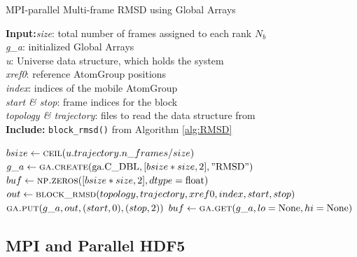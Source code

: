 \begin{algorithm}[ht!]
	\scriptsize
	\caption{MPI-parallel Multi-frame RMSD using Global Arrays}
	\label{alg:GA}
	\hspace*{\algorithmicindent} \textbf{Input:}\emph{size}: total number of frames assigned to each rank $N_{b}$\\
	\hspace*{\algorithmicindent} \emph{g\_a}: initialized Global Arrays \\
        \hspace*{\algorithmicindent} \emph{u}: Universe data structure, which holds the system\\
	\hspace*{\algorithmicindent} \emph{xref0}: reference AtomGroup positions \\
        \hspace*{\algorithmicindent} \emph{index}: indices of the mobile AtomGroup\\
	\hspace*{\algorithmicindent} \emph{start \& stop}: frame indices for the block \\
	\hspace*{\algorithmicindent} \emph{topology \& trajectory}: files to read the data structure from \\
	\hspace*{\algorithmicindent}\textbf{Include:} \texttt{block\_rmsd()} from Algorithm \protect\ref{alg:RMSD}
	\begin{algorithmic}[1]		
		\State $bsize \gets \Call{ceil}{u.trajectory.n\_frames / size}$
		\State $g\_a \gets \Call{ga.create}{\text{ga.C\_DBL}, [bsize*size,2], "\text{RMSD}"}$
		\State $buf \gets \Call{np.zeros}{[bsize*size,2], dtype=\text{float}}$
		\State $out \gets \Call{block\_rmsd}{topology, trajectory, xref0, index, start, stop}$
		\State $\Call{ga.put}{g\_a, out, (start,0), (stop,2)}$
		\State $buf \gets \Call{ga.get}{g\_a, lo=\text{None}, hi=\text{None}}$
		\EndIf
	\end{algorithmic}
\end{algorithm}

\subsection{MPI and Parallel HDF5}
\label{sec:methods-hdf5}

